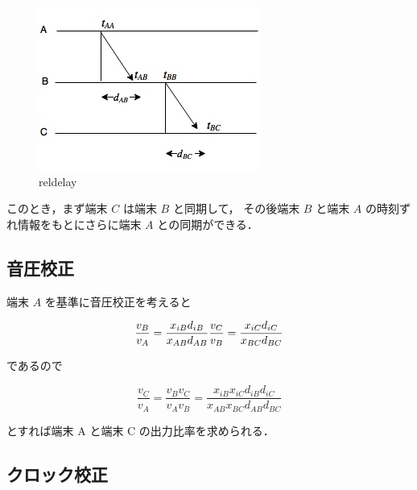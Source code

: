 \begin{figure}[p]\centering
  \hspace{-2mm}\includegraphics[clip,width=1.1\hsize]{img/rel_delay.png}
  \caption{reldelay}\label{fig:reldelay}
\end{figure}

このとき，まず端末 $C$ は端末 $B$ と同期して，
その後端末 $B$ と端末 $A$ の時刻ずれ情報をもとにさらに端末 $A$ との同期ができる．


\subsection{音圧校正}

端末 $A$ を基準に音圧校正を考えると

$$
\frac{v_B}{v_A} = \frac{x_{iB} d_{iB}}{x_{AB}d_{AB}} \\
\frac{v_C}{v_B} = \frac{x_{iC} d_{iC}}{x_{BC}d_{BC}} \\
$$

であるので

$$
\frac{v_C}{v_A} =
\frac{v_B v_C}{v_A v_B} =
\frac{x_{iB} x_{iC} d_{iB} d_{iC}}{x_{AB} x_{BC} d_{AB} d_{BC}}
$$

とすれば端末 A と端末 C の出力比率を求められる．

\subsection{クロック校正}

